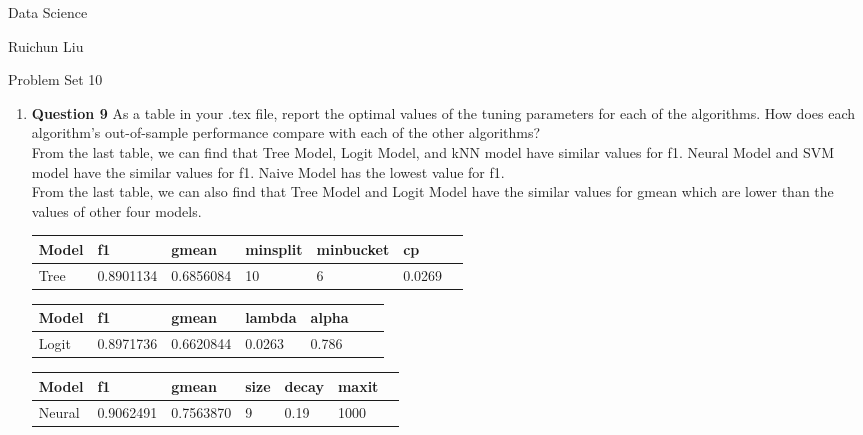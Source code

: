 \documentclass[11pt,a4paper]{article}
\begin{document}
	\begin{center}
		Data Science
		
		Ruichun Liu
		
		Problem Set 10
	\end{center}
\begin{enumerate}

    \item \textbf{Question 9} As a table in your .tex file, report the       optimal values of the tuning parameters for each
          of the algorithms. How does each algorithm’s out-of-sample performance compare with each of the other algorithms?\\
          
          From the last table, we can find that Tree Model, Logit Model, and kNN model have similar values for f1. Neural Model and SVM model have the similar values for f1. Naive Model has the lowest value for f1.\\
          
          From the last table, we can also find that Tree Model and Logit Model have the similar values for gmean which are lower than the values of other four models. 
          
          
          


		  
\begin{table}[h!]
\centering
\begin{tabular}{|l|l|l|l|l|l|l|}
\hline
Model & f1        & gmean     & minsplit & minbucket & cp     \\ \hline
Tree  & 0.8901134 & 0.6856084 & 10       & 6         & 0.0269 \\ \hline
\end{tabular}
\end{table}

\begin{table}[h!]
\centering
\begin{tabular}{|l|l|l|l|l|l|l|}
\hline
Model & f1        & gmean     & lambda & alpha \\ \hline
Logit & 0.8971736 & 0.6620844 & 0.0263 & 0.786 \\ \hline
\end{tabular}
\end{table}

\begin{table}[h!]
\centering
\begin{tabular}{|l|l|l|l|l|l|l|}
\hline
Model  & f1        & gmean     & size & decay & maxit \\ \hline
Neural & 0.9062491 & 0.7563870 & 9    & 0.19  & 1000  \\ \hline
\end{tabular}
\end{table}


\end{enumerate}
\end{document}
